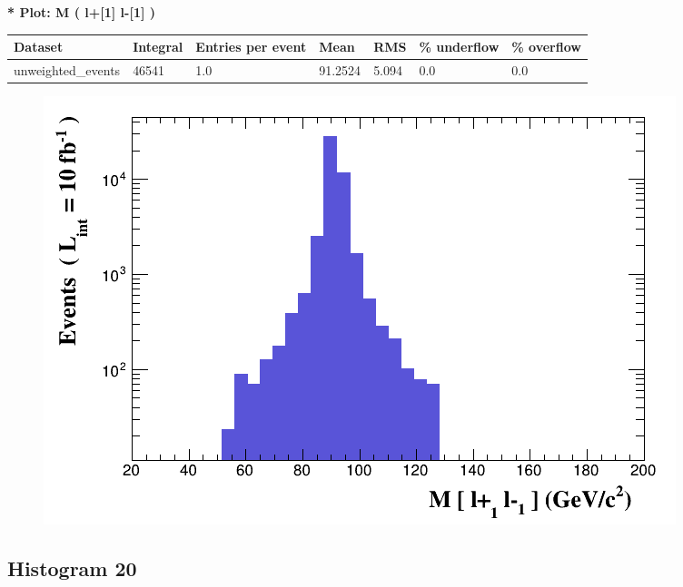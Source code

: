 \documentclass[a4paper, 10pt]{article}
\begin{document}
\textbf{* Plot: M ( l+[1] l-[1] ) }\\
   \begin{table}[H]
  \begin{center}
    \begin{tabular}{|m{23.0mm}|m{23.0mm}|m{18.0mm}|m{19.0mm}|m{19.0mm}|m{19.0mm}|m{19.0mm}|}
      \hline
      {\cellcolor{yellow}         Dataset}& {\cellcolor{yellow}         Integral}& {\cellcolor{yellow}         Entries per event}& {\cellcolor{yellow}         Mean}& {\cellcolor{yellow}         RMS}& {\cellcolor{yellow}         \% underflow}& {\cellcolor{yellow}         \% overflow}\\
      \hline
      {\cellcolor{white}         unweighted\_events}& {\cellcolor{white}         46541}& {\cellcolor{white}         1.0}& {\cellcolor{white}         91.2524}& {\cellcolor{white}         5.094}& {\cellcolor{green}         0.0}& {\cellcolor{green}         0.0}\\
\hline
    \end{tabular}
  \end{center}
\end{table}

\begin{figure}[H]
  \begin{center}
    \includegraphics[scale=0.45]{selection_18.png}\\
\caption{   }
  \end{center}
\end{figure}
      \newpage
\subsection{ Histogram 20}
\end{document}
